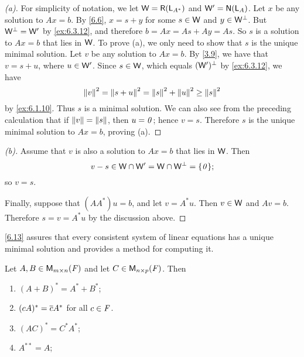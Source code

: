 \begin{proof}[(a)]
  For simplicity of notation, we let \(\W = \rg{\L_{A^*}}\) and \(\W' = \ns{\L_A}\).
  Let \(x\) be any solution to \(Ax = b\).
  By \cref{6.6}, \(x = s + y\) for some \(s \in \mathsf{W}\) and \(y \in \mathsf{W}^{\perp}\).
  But \(\mathsf{W}^{\perp} = \mathsf{W}'\) by \cref{ex:6.3.12}, and therefore \(b = Ax = As + Ay = As\).
  So \(s\) is a solution to \(Ax = b\) that lies in \(\mathsf{W}\).
  To prove (a), we only need to show that \(s\) is the unique minimal solution.
  Let \(v\) be any solution to \(Ax = b\).
  By \cref{3.9}, we have that \(v = s + u\), where \(u \in \mathsf{W}'\).
  Since \(s \in \mathsf{W}\), which equals \((\mathsf{W}')^{\perp}\) by \cref{ex:6.3.12}, we have
  \[
    \left\lVert v\right\rVert^2 = \left\lVert s + u\right\rVert^2 = \left\lVert s\right\rVert^2 + \left\lVert u\right\rVert^2 \geq \left\lVert s\right\rVert^2
  \]
  by \cref{ex:6.1.10}.
  Thus \(s\) is a minimal solution.
  We can also see from the preceding calculation that if \(\left\lVert v\right\rVert = \left\lVert s\right\rVert\), then \(u = \mathit{0}\);
  hence \(v = s\).
  Therefore \(s\) is the unique minimal solution to \(Ax = b\), proving (a).
\end{proof}

\begin{proof}[(b)]
  Assume that \(v\) is also a solution to \(Ax = b\) that lies in \(\mathsf{W}\).
  Then
  \[
    v - s \in \W \cap \W' = \W \cap \W^{\perp} = \set{\zv};
  \]
  so \(v = s\).

  Finally, suppose that \((A A^*) u = b\), and let \(v = A^* u\).
  Then \(v \in \mathsf{W}\) and \(Av = b\).
  Therefore \(s = v = A^* u\) by the discussion above.
\end{proof}

\begin{note}
  \cref{6.13} assures that every consistent system of linear equations has a unique minimal solution and provides a method for computing it.
\end{note}

\exercisesection

\setcounter{ex}{4}
\begin{ex}\label{ex:6.3.5}
  Let \(A, B \in \ms\) and let \(C \in \ms[n][p][\F]\).
  Then
  \begin{enumerate}
    \item \((A + B)^* = A^* + B^*\);
    \item \((cA)^* = \overline{c} A^*\) for all \(c \in \mathit{F}\).
    \item \((AC)^* = C^* A^*\);
    \item \(A^{**} = A\);
  \end{enumerate}
\end{ex}

